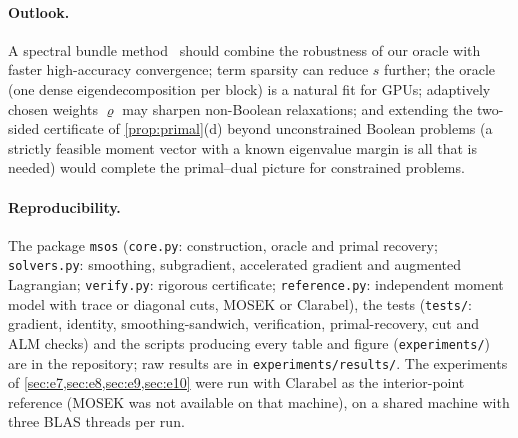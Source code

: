 \documentclass[a4paper,11pt]{article}
\theoremstyle{plain}
\theoremstyle{definition}
\theoremstyle{remark}
\begin{document}
\paragraph{Outlook.} A spectral bundle method~\cite{helmberg2000,mai2023spectral} should combine the robustness of our oracle with faster high-accuracy convergence; term sparsity can reduce $s$ further; the oracle (one dense eigendecomposition per block) is a natural fit for GPUs; adaptively chosen weights $\varrho$ may sharpen non-Boolean relaxations; and extending the two-sided certificate of \cref{prop:primal}(d) beyond unconstrained Boolean problems (a strictly feasible moment vector with a known eigenvalue margin is all that is needed) would complete the primal--dual picture for constrained problems.

\paragraph{Reproducibility.} The package \texttt{msos} (\texttt{core.py}: construction, oracle and primal recovery; \texttt{solvers.py}: smoothing, subgradient, accelerated gradient and augmented Lagrangian; \texttt{verify.py}: rigorous certificate; \texttt{reference.py}: independent moment model with trace or diagonal cuts, MOSEK or Clarabel), the tests (\texttt{tests/}: gradient, identity, smoothing-sandwich, verification, primal-recovery, cut and ALM checks) and the scripts producing every table and figure (\texttt{experiments/}) are in the repository; raw results are in \texttt{experiments/results/}. The experiments of \cref{sec:e7,sec:e8,sec:e9,sec:e10} were run with Clarabel as the interior-point reference (MOSEK was not available on that machine), on a shared machine with three BLAS threads per run.

\appendix
\end{document}
